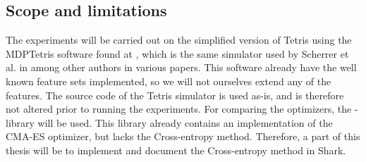 \subsection{Scope and limitations \label{section:scope}}


The experiments will be carried out on the simplified version of
Tetris using the MDPTetris software found at \citep{mdptetris},
which is the same simulator used by Scherrer et al. in \citep{scherrer2009:b} 
among other authors in various papers.
This software already have the well known feature sets
implemented, so we will not ourselves extend any of the features.
The source code of the Tetris simulator is used as-is, and is therefore 
not altered prior to running the experiments. 
For comparing the optimizers, the \shark -library will be used. 
This library already contains an
implementation of the CMA-ES optimizer, but lacks the 
Cross-entropy method. Therefore, a part of this thesis will
be to implement and document the Cross-entropy method in Shark.





